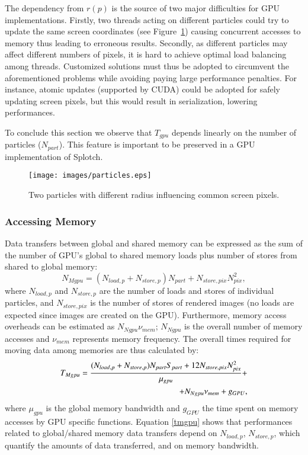 \documentclass[1p]{elsarticle}
\begin{document}
The dependency from $r(p)$ is the source of two major difficulties for GPU implementations. Firstly, two threads acting on different particles could try 
to update the same screen coordinates (see Figure~\ref{fig:particles}) causing concurrent accesses to memory thus leading to erroneous results. 
Secondly, as different particles may affect different numbers of pixels, it is hard to achieve optimal load balancing among threads.  
Customized solutions must thus be adopted to circumvent the aforementioned problems while avoiding paying large performance penalties. For instance, atomic updates (supported by CUDA) could be adopted for safely updating screen pixels, but this would result in serialization, lowering performances. 

To conclude this section we observe that $T_{gpu}$ depends linearly on the number of particles ($N_{part}$). This feature is important to be preserved in a GPU implementation of Splotch.

\begin{figure}
\centering
\texttt{[image: images/particles.eps]}
\caption{Two particles with different radius influencing common screen pixels.}
\label{fig:particles}
\end{figure}


\subsubsection{Accessing Memory}
Data transfers between global and shared memory can be expressed 
as the sum of the number of GPU's global to shared memory loads plus number of stores from shared to global memory:
\begin{equation}
N_{Mgpu} = (N_{load,p} + N_{store,p}) N_{part} + N_{store,pix} N_{pix}^2,
\end{equation}
where $N_{load,p}$ and $N_{store,p}$ are the number of loads and stores of individual 
particles, and $N_{store,pix}$ is the number of stores of rendered images (no loads 
are expected since images are created on the GPU). 
Furthermore, memory access overheads can be estimated as $N_{Ngpu} \nu_{mem}$; $N_{Ngpu}$ is the overall number of memory accesses and $\nu_{mem}$ represents memory frequency. The overall times required for moving data among memories are thus calculated by:
\begin{equation}\label{tmgpu}
\begin{split}
T_{Mgpu} = {(N_{load,p} + N_{store,p}) N_{part} S_{part}
+ 12 N_{store,pix} N_{pix}^2\over \mu_{gpu}} + \\
+ N_{Ngpu} \nu_{mem} + g_{GPU},
\end{split}
\end{equation}
where $\mu_{gpu}$ is the global memory bandwidth
and $g_{GPU}$ the time 
spent on memory accesses by GPU specific functions. Equation \eqref{tmgpu} shows that performances related to global/shared memory data transfers depend on $N_{load,p}$, $N_{store,p}$, which quantify the amounts of data transferred, and on memory bandwidth.
\end{document}
